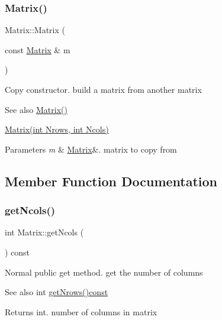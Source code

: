 \subsubsection{\texorpdfstring{Matrix()}{Matrix()}\hspace{0.1cm}{\footnotesize\ttfamily [3/3]}}
{\footnotesize\ttfamily Matrix\+::\+Matrix (\begin{DoxyParamCaption}\item[{const \hyperlink{class_matrix}{Matrix} \&}]{m }\end{DoxyParamCaption})}

Copy constructor. build a matrix from another matrix \begin{DoxySeeAlso}{See also}
\hyperlink{class_matrix_a2dba13c45127354c9f75ef576f49269b}{Matrix()} 

\hyperlink{class_matrix_a135a15de1126d735bb95fcc839d739d7}{Matrix(int Nrows, int Ncols)} 
\end{DoxySeeAlso}

\begin{DoxyParams}{Parameters}
{\em m} & \hyperlink{class_matrix}{Matrix}\&. matrix to copy from \\
\hline
\end{DoxyParams}


\subsection{Member Function Documentation}
\mbox{\label{class_matrix_ae0a5f2154953b8d129a90b04f91d9079}} 
\subsubsection{\texorpdfstring{get\+Ncols()}{getNcols()}}
{\footnotesize\ttfamily int Matrix\+::get\+Ncols (\begin{DoxyParamCaption}{ }\end{DoxyParamCaption}) const}

Normal public get method. get the number of columns \begin{DoxySeeAlso}{See also}
int \hyperlink{class_matrix_a711f84a1c62832d9d197d78c9855a276}{get\+Nrows()const} 
\end{DoxySeeAlso}
\begin{DoxyReturn}{Returns}
int. number of columns in matrix 
\end{DoxyReturn}
\mbox{\label{class_matrix_a711f84a1c62832d9d197d78c9855a276}} 

